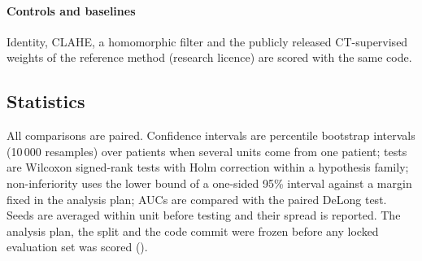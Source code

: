 \paragraph{Controls and baselines} Identity, CLAHE, a homomorphic filter and the publicly released CT-supervised weights of the reference method
(research licence) are scored with the same code.

\subsection{Statistics}
All comparisons are paired. Confidence intervals are percentile bootstrap intervals (10\,000 resamples) over patients when several units come from one patient;
tests are Wilcoxon signed-rank tests with Holm correction within a hypothesis family; non-inferiority uses the lower bound of a one-sided 95\% interval against a
margin fixed in the analysis plan; AUCs are compared with the paired DeLong test. Seeds are averaged within unit before testing and their spread is reported.
The analysis plan, the split and the code commit were frozen before any locked evaluation set was scored ().
